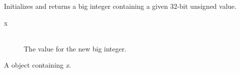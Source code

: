 
Initializes and returns a big integer containing a given 32-bit unsigned value.


\docparams

\begin{description}
\item[x] \hfill \\ The value for the new big integer.
\end{description}

\docretval

A  object containing \emph{x}.

